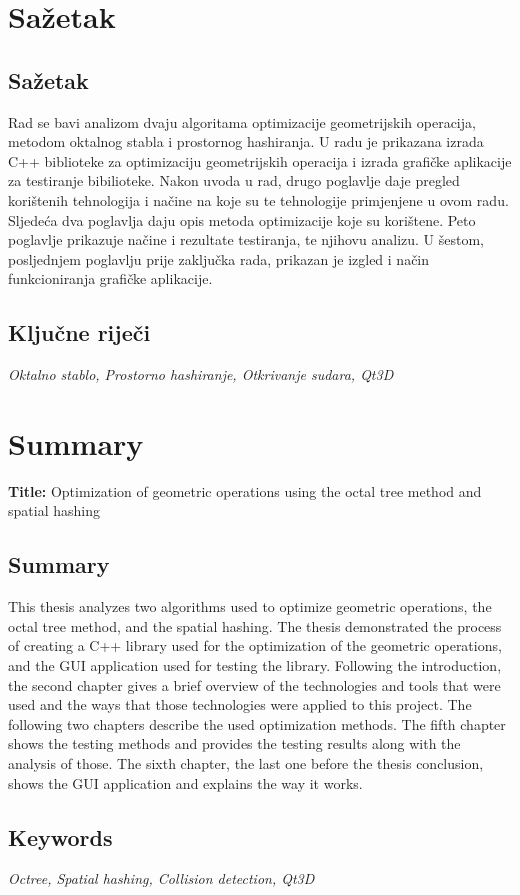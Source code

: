 \chapter*{Sažetak}

\section*{Sažetak}

Rad se bavi analizom dvaju algoritama optimizacije geometrijskih operacija,
metodom oktalnog stabla i prostornog hashiranja. U radu je prikazana
izrada C++ biblioteke za optimizaciju geometrijskih operacija i izrada
grafičke aplikacije za testiranje bibilioteke. Nakon uvoda u rad,
drugo poglavlje daje pregled korištenih tehnologija i načine na koje
su te tehnologije primjenjene u ovom radu. Sljedeća dva poglavlja
daju opis metoda optimizacije koje su korištene. Peto poglavlje prikazuje
načine i rezultate testiranja, te njihovu analizu. U šestom, posljednjem
poglavlju prije zaključka rada, prikazan je izgled i način funkcioniranja
grafičke aplikacije.

\section*{Ključne riječi}
\textit{
    Oktalno stablo, Prostorno hashiranje, Otkrivanje sudara, Qt3D
}


\chapter*{Summary}

\textbf{Title: } Optimization of geometric operations using the octal tree method and spatial hashing
\section*{Summary}

This thesis analyzes two algorithms used to optimize geometric operations,
the octal tree method, and the spatial hashing. The thesis demonstrated the process
of creating a C++ library used for the optimization of the geometric operations, 
and the GUI application used for testing the library. Following the introduction,
the second chapter gives a brief overview of the technologies and tools that were used
and the ways that those technologies were applied to this project.
The following two chapters describe the used optimization methods.
The fifth chapter shows the testing methods and provides the testing results
along with the analysis of those. The sixth chapter, the last one before the thesis
conclusion, shows the GUI application and explains the way it works.

\section*{Keywords}
\textit{
    Octree, Spatial hashing, Collision detection, Qt3D
}
